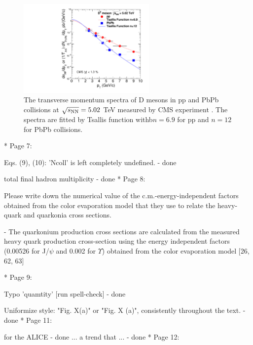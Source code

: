 \documentclass[a4paper,11pt]{article}
\begin{document}
\begin{figure}
  \includegraphics[width=0.60\textwidth]{Figure3_DMeson_502TeV.pdf}
  \caption{The transverse momentum spectra of D mesons in pp and PbPb collisions
    at $\sqrt{s_{\rm NN}}=5.02$ TeV measured by CMS experiment \cite{Sirunyan:2017xss}.
    The spectra are fitted
    by Tsallis function withb$n=6.9$ for pp and $n=12$ for PbPb collisions.
  }
  \label{fig:Figure_Tsallis}
\end{figure}



* Page 7: 

Eqs. (9), (10): 'Ncoll' is left completely undefined.
- {\color{blue} done}\newline

total final hadron multiplicity 
- {\color{blue} done}\newline
* Page 8: 

Please write down the numerical value of the c.m.-energy-independent factors obtained 
from the color evaporation model that they use to relate the heavy-quark and quarkonia 
cross sections. 

- {\color{red} The quarkonium production cross sections are calculated from the measured heavy quark
  production cross-section using the energy independent factors (0.00526 for J/$\psi$ and 0.002 for $\Upsilon$)
  obtained from the color evaporation model [26, 62, 63]}\newline

* Page 9: 

Typo 'quamtity' [run spell-check] 
- {\color{blue} done}\newline

Uniformize style: "Fig. X(a)" or "Fig. X (a)", consistently throughout the text. 
- {\color{blue} done}\newline
* Page 11: 

for the ALICE 
- {\color{blue} done}\newline
... a trend that ... 
- {\color{blue} done}\newline
* Page 12: 
\end{document}
